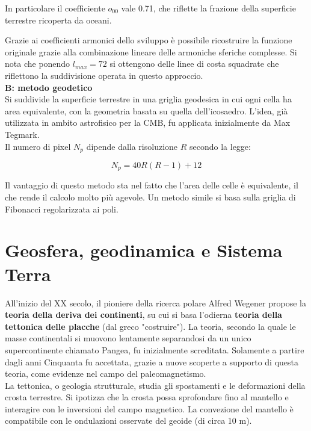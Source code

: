 \documentclass[a4paper,12pt]{book}
\begin{document}
\noindent In particolare il coefficiente $o_{00}$ vale 0.71, che riflette la frazione della superficie terrestre ricoperta da oceani.

\noindent Grazie ai coefficienti armonici dello sviluppo è possibile ricostruire la funzione originale grazie alla combinazione lineare delle armoniche sferiche complesse.
Si nota che ponendo $l_{max} = 72$ si ottengono delle linee di costa squadrate che riflettono la suddivisione operata in questo approccio.\\

\noindent \textbf{B: metodo geodetico}\\

\noindent
Si suddivide la superficie terrestre in una griglia geodesica in cui ogni cella ha area equivalente, con la geometria basata su quella dell'icosaedro.
L'idea, già utilizzata in ambito astrofisico per la CMB, fu applicata inizialmente da Max Tegmark.\\

\noindent
Il numero di pixel $N_p$ dipende dalla risoluzione $R$ secondo la legge:

\begin{equation}
    N_p = 40R(R-1)+12
\end{equation}

\noindent Il vantaggio di questo metodo sta nel fatto che l'area delle celle è equivalente, il che rende il calcolo molto più agevole.
Un metodo simile si basa sulla griglia di Fibonacci regolarizzata ai poli.

\newpage

\section{\textcolor{colore2}{Geosfera, geodinamica e Sistema Terra}}

All'inizio del XX secolo, il pioniere della ricerca polare Alfred Wegener propose la \textbf{teoria della deriva dei continenti}, su cui si basa l'odierna \textbf{teoria della tettonica delle placche} (dal greco "costruire").
La teoria, secondo la quale le masse continentali si muovono lentamente separandosi da un unico supercontinente chiamato Pangea, fu inizialmente screditata.
Solamente a partire dagli anni Cinquanta fu accettata, grazie a nuove scoperte a supporto di questa teoria, come evidenze nel campo del paleomagnetismo.\\

\noindent
La tettonica, o geologia strutturale, studia gli spostamenti e le deformazioni della crosta terrestre.
Si ipotizza che la crosta possa sprofondare fino al mantello e interagire con le inversioni del campo magnetico.
La convezione del mantello è compatibile con le ondulazioni osservate del geoide (di circa 10 m).
\end{document}
